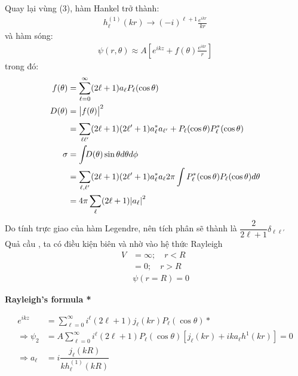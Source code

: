 \documentclass{report}
\renewcommand{\l}{\ell}
\begin{document}
	Quay lại vùng (3), hàm Hankel trở thành:
	\begin{align*}
		h_{\l}^{(1)}(kr) \rightarrow (-i)^{\l+1}\frac{e^{ikr}}{kr}
	\end{align*}
	và hàm sóng:
	\begin{align*}
		\psi(r,\theta) \approx A \left[e^{ikz}+ f(\theta)\frac{e^{ikr}}{r}\right]
	\end{align*}
	trong đó:
	\begin{align*}
		f(\theta) & = \sum_{\l=0}^{\infty}(2\l+1)a_{\l} P_{\l}(\cos\theta)                                                               \\
		D(\theta) & = \abs{f(\theta)}^2                                                                                                  \\
		          & = \sum_{\l\l'}^{}(2\l+1)(2\l'+1) a^{\ast}_{\l} a_{\l'} + P_{\l}(\cos\theta) P^{*}_{\l}(\cos\theta)                   \\
		\sigma    & =    \int_{}D(\theta)\sin\theta d\theta d\phi                                                                        \\
		          & = \sum_{\l,\l'}^{}(2\l+1)(2\l'+1)a^{\ast}_{\l}a_{\l} 2\pi\int P_{\l}^{\ast}(\cos\theta)   P_{\l}(\cos\theta) d\theta \\
		          & = 4\pi \sum_{\l}(2\l+1)\abs{a_\l}^2
	\end{align*}
	Do tính trực giao của hàm Legendre, nên tích phân sẽ thành là $\dfrac{2}{2\l+1}\delta_{\l\l'}$\\
	Quả cầu , ta có điều kiện biên và nhờ vào hệ thức Rayleigh
	\begin{align*}
		V & = \infty; \quad r<R \\
		  & = 0; \quad r>R      \\
		  & \psi(r=R) = 0
	\end{align*}

	\textbf{Rayleigh’s formula *}

	\begin{align}
		e^{ikz}            & = \sum_{\l=0}^{\infty}i^{\l}(2\l+1)j_{\l} (kr) P_{\l}(\cos\theta) *                                    \\
		\Rightarrow \psi_2 & = A\sum_{\l=0}^{\infty}i^{\l}(2\l+1)P_{\l}(\cos\theta)\left[ j_{\l} (kr)+ika_{\l}h^{1}(kr) \right] = 0 \label{eq1.5} \\
		\Rightarrow a_{\l} & = i\dfrac{j_{\l}(kR)}{k h^{(1)}_{\l}(kR)}\nonumber
	\end{align}
\end{document}
